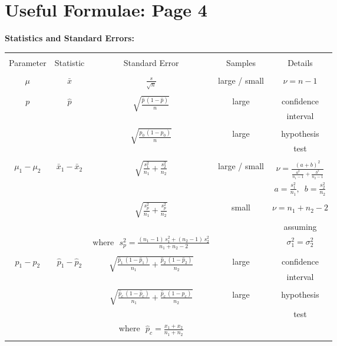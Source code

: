\documentclass[12pt]{article}
\begin{document}
\section*{Useful Formulae: Page 4\\[0.3cm]}
{\bf Statistics and Standard Errors:}\\[0.1cm]
\begin{adjustwidth}{-2cm}{0cm}
\begin{tabular}{|c|c|c|c|c|}
\hline
&&&&\\[-0.1cm]
Parameter & Statistic & Standard Error & Samples & Details \\[0.3cm]
\hline
&&&&\\[-0.1cm]
$\mu$ & $\bar x$ & ${\displaystyle\frac{s}{\sqrt{n}}}$  & large / small & $\nu = n - 1$ \\[0.5cm]
\hline
&&&&\\[-0.1cm]
$p$ & $\hat p$ & \multirow{2}{*}{${\displaystyle\sqrt{\frac{\hat p\,(1-\hat p)}{n}}}$} & large & confidence \\[-0.1cm]
&&&&interval\\[0.3cm]
\cline{3-5}
&&&&\\[-0.1cm]
&  & \multirow{2}{*}{${\displaystyle\sqrt{\frac{p_0\,(1-p_0)}{n}}}$} & large & hypothesis \\[-0.1cm]
&&&&test\\[0.3cm]
\hline
&&&&\\[-0.1cm]
$\mu_1-\mu_2$ & $\bar x_1 - \bar x_2$ & \multirow{3}{*}{${\displaystyle\sqrt{\frac{s_1^2}{n_1}+\frac{s_2^2}{n_2}}}$} & large / small & ${\displaystyle \nu = \frac{(a+b)^2}{\frac{a^2}{n_1-1}+\frac{b^2}{n_2-1}}}$ \\[0.8cm]
&&&& ${\displaystyle a=\frac{s_1^2}{n_1}, \,\,\, b=\frac{s_2^2}{n_2}}$ \\[0.5cm]
\cline{3-5}
&&&&\\[-0.1cm]
&  & ${\displaystyle\sqrt{\frac{s_p^2}{n_1}+\frac{s_p^2}{n_2}}}$ & small & $\nu = n_1+n_2-2$ \\[0.5cm]
&&&& assuming \\[-0.2cm]
&& where\,\, ${\displaystyle s_p^2 = \frac{(n_1-1)\,s_1^2+(n_2-1)\,s_2^2}{n_1+n_2-2}}$  && $\sigma_1^2 = \sigma_2^2$ \\[0.5cm]
\hline
&&&&\\[-0.1cm]
$p_1-p_2$ & $\hat p_1 - \hat p_2$ & \multirow{2}{*}{${\displaystyle\sqrt{\frac{\hat p_1 \, (1-\hat p_1)}{n_1}+\frac{\hat p_2 \, (1-\hat p_2)}{n_2}}}$} & large & confidence\\[-0.1cm]
&&&&interval\\[0.5cm]
\cline{3-5}
&&&&\\[-0.1cm]
&  & ${\displaystyle\sqrt{\frac{\hat p_c\,(1-\hat p_c)}{n_1}+\frac{\hat p_c\,(1-\hat p_c)}{n_2}}}$ & large & hypothesis\\[-0.4cm]
&&&&test\\[0.2cm]
&&where\,\, ${\displaystyle \hat p_c = \frac{x_1+x_2}{n_1+n_2}}$&&\\[0.5cm]
\hline
\multicolumn{5}{c}{}\\[0.5cm]
\end{tabular}
\end{adjustwidth}
\end{document}
